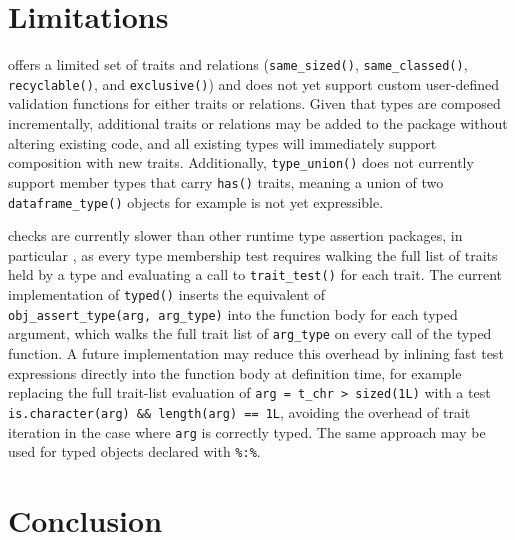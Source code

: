 \section{Limitations}\label{sec-limitations}

 offers a limited set of traits and relations (\texttt{same\_sized()}, \texttt{same\_classed()}, \texttt{recyclable()}, and \texttt{exclusive()}) and does not yet support custom user-defined validation functions for either traits or relations. Given that types are composed incrementally, additional traits or relations may be added to the package without altering existing code, and all existing types will immediately support composition with new traits. Additionally, \texttt{type\_union()} does not currently support member types that carry \texttt{has()} traits, meaning a union of two \texttt{dataframe\_type()} objects for example is not yet expressible.

 checks are currently slower than other runtime type assertion packages, in particular , as every type membership test requires walking the full list of traits held by a type and evaluating a call to \texttt{trait\_test()} for each trait. The current implementation of \texttt{typed()} inserts the equivalent of \texttt{obj\_assert\_type(arg,\ arg\_type)} into the function body for each typed argument, which walks the full trait list of \texttt{arg\_type} on every call of the typed function. A future implementation may reduce this overhead by inlining fast test expressions directly into the function body at definition time, for example replacing the full trait-list evaluation of \texttt{arg\ =\ t\_chr\ \textbar{}\textgreater{}\ sized(1L)} with a test \texttt{is.character(arg)\ \&\&\ length(arg)\ ==\ 1L}, avoiding the overhead of trait iteration in the case where \texttt{arg} is correctly typed. The same approach may be used for typed objects declared with \texttt{\%:\%}.

\section{Conclusion}\label{sec-conclusion}

